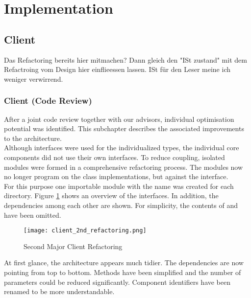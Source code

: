 \section{Implementation}

\subsection{Client}
Das Refactoring bereits hier mitmachen?
Dann gleich den "ISt zustand" mit dem Refactroing vom Design hier einflieessen lassen.
ISt für den Leser meine ich weniger verwirrend.



\subsubsection{Client (Code Review)}
After a joint code review together with our advisors, individual optimisation potential was identified.
This subchapter describes the associated improvements to the architecture. \\

Although interfaces were used for the individualized types,
the individual core components did not use their own interfaces.
To reduce coupling, isolated modules were formed in a comprehensive refactoring process.
The modules now no longer program on the class implementations, but against the interface. \\

For this purpose one importable module with the name  was created for each directory.
Figure \ref{fig:client_2nd_refactoring} shows an overview of the interfaces.
In addition, the dependencies among each other are shown.
For simplicity, the contents of  and  have been omitted. \\

\begin{figure}[H]
    \centering
    \texttt{[image: client\_2nd\_refactoring.png]}
    \caption{Second Major Client Refactoring}
    \label{fig:client_2nd_refactoring}
\end{figure}

At first glance, the architecture appears much tidier.
The dependencies are now pointing from top to bottom.
Methods have been simplified and the number of parameters could be reduced significantly.
Component identifiers have been renamed to be more understandable. \\

